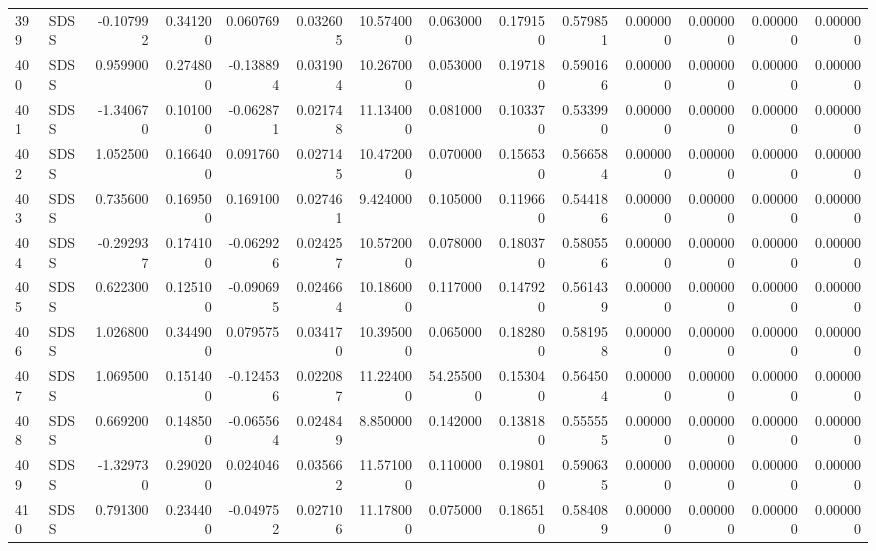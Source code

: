 \begin{tabular}{llrrrrrrrrrrrr}
399 &   SDSS & -0.107992 &      0.341200 &  0.060769 &    0.032605 &  10.574000 &      0.063000 &   0.179150 &  0.579851 &  0.000000 &   0.000000 &     0.000000 &     0.000000 \\
400 &   SDSS &  0.959900 &      0.274800 & -0.138894 &    0.031904 &  10.267000 &      0.053000 &   0.197180 &  0.590166 &  0.000000 &   0.000000 &     0.000000 &     0.000000 \\
401 &   SDSS & -1.340670 &      0.101000 & -0.062871 &    0.021748 &  11.134000 &      0.081000 &   0.103370 &  0.533990 &  0.000000 &   0.000000 &     0.000000 &     0.000000 \\
402 &   SDSS &  1.052500 &      0.166400 &  0.091760 &    0.027145 &  10.472000 &      0.070000 &   0.156530 &  0.566584 &  0.000000 &   0.000000 &     0.000000 &     0.000000 \\
403 &   SDSS &  0.735600 &      0.169500 &  0.169100 &    0.027461 &   9.424000 &      0.105000 &   0.119660 &  0.544186 &  0.000000 &   0.000000 &     0.000000 &     0.000000 \\
404 &   SDSS & -0.292937 &      0.174100 & -0.062926 &    0.024257 &  10.572000 &      0.078000 &   0.180370 &  0.580556 &  0.000000 &   0.000000 &     0.000000 &     0.000000 \\
405 &   SDSS &  0.622300 &      0.125100 & -0.090695 &    0.024664 &  10.186000 &      0.117000 &   0.147920 &  0.561439 &  0.000000 &   0.000000 &     0.000000 &     0.000000 \\
406 &   SDSS &  1.026800 &      0.344900 &  0.079575 &    0.034170 &  10.395000 &      0.065000 &   0.182800 &  0.581958 &  0.000000 &   0.000000 &     0.000000 &     0.000000 \\
407 &   SDSS &  1.069500 &      0.151400 & -0.124536 &    0.022087 &  11.224000 &     54.255000 &   0.153040 &  0.564504 &  0.000000 &   0.000000 &     0.000000 &     0.000000 \\
408 &   SDSS &  0.669200 &      0.148500 & -0.065564 &    0.024849 &   8.850000 &      0.142000 &   0.138180 &  0.555555 &  0.000000 &   0.000000 &     0.000000 &     0.000000 \\
409 &   SDSS & -1.329730 &      0.290200 &  0.024046 &    0.035662 &  11.571000 &      0.110000 &   0.198010 &  0.590635 &  0.000000 &   0.000000 &     0.000000 &     0.000000 \\
410 &   SDSS &  0.791300 &      0.234400 & -0.049752 &    0.027106 &  11.178000 &      0.075000 &   0.186510 &  0.584089 &  0.000000 &   0.000000 &     0.000000 &     0.000000 \\

\end{tabular}
